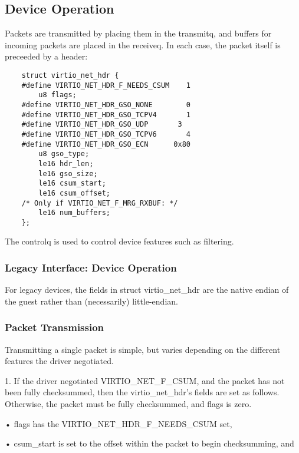 \subsection{Device Operation}\label{sec:Device Types / Network Device / Device Operation}

Packets are transmitted by placing them in the transmitq, and
buffers for incoming packets are placed in the receiveq. In each
case, the packet itself is preceeded by a header:

\begin{lstlisting}
	struct virtio_net_hdr {
	#define VIRTIO_NET_HDR_F_NEEDS_CSUM    1
		u8 flags;
	#define VIRTIO_NET_HDR_GSO_NONE        0
	#define VIRTIO_NET_HDR_GSO_TCPV4       1
	#define VIRTIO_NET_HDR_GSO_UDP		 3
	#define VIRTIO_NET_HDR_GSO_TCPV6       4
	#define VIRTIO_NET_HDR_GSO_ECN      0x80
		u8 gso_type;
		le16 hdr_len;
		le16 gso_size;
		le16 csum_start;
		le16 csum_offset;
	/* Only if VIRTIO_NET_F_MRG_RXBUF: */
		le16 num_buffers;
	};
\end{lstlisting}

The controlq is used to control device features such as
filtering.

\subsubsection{Legacy Interface: Device Operation}\label{sec:Device Types / Network Device / Device Operation / Legacy Interface: Device Operation}
For legacy devices, the fields in struct virtio_net_hdr are the
native endian of the guest rather than (necessarily) little-endian.

\subsubsection{Packet Transmission}\label{sec:Device Types / Network Device / Device Operation / Packet Transmission}

Transmitting a single packet is simple, but varies depending on
the different features the driver negotiated.

1. If the driver negotiated VIRTIO_NET_F_CSUM, and the packet has
  not been fully checksummed, then the virtio_net_hdr's fields
  are set as follows. Otherwise, the packet must be fully
  checksummed, and flags is zero.

  • flags has the VIRTIO_NET_HDR_F_NEEDS_CSUM set,

  • csum_start is set to the offset within the packet to begin checksumming,
    and

